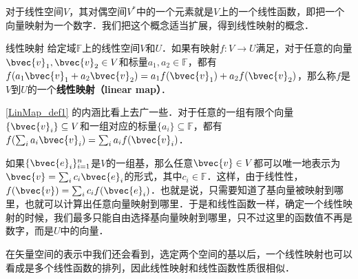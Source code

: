 



对于线性空间$V$，其对偶空间$V^*$中的一个元素就是$V$上的一个线性函数，即把一个向量映射为一个数字．我们把这个概念适当扩展，得到线性映射的概念．

\begin{definition}{线性映射}\label{LinMap_def1}
给定域$\mathbb{F}$上的线性空间$V$和$U$．如果有映射$f:V\rightarrow U$满足，对于任意的向量$\bvec{v}_1, \bvec{v}_2\in V$和标量$a_1, a_2\in\mathbb{F}$，都有$f(a_1\bvec{v}_1+a_2\bvec{v}_2)=a_1f(\bvec{v}_1)+a_2f(\bvec{v}_2)$，那么称$f$是$V$到$U$的一个\textbf{线性映射（linear map）}．
\end{definition}


\autoref{LinMap_def1} 的内涵比看上去广一些．对于任意的一组有限个向量$\{\bvec{v}_i\}\subseteq V$和一组对应的标量$\{a_i\}\subseteq\mathbb{F}$，都有$f(\sum_i a_i\bvec{v}_i)=\sum_i a_if(\bvec{v}_i)$．

如果$\{\bvec{e}_i\}_{i=1}^n$是$V$的一组基，那么任意$\bvec{v}\in V$都可以唯一地表示为$\bvec{v}=\sum_i c_i\bvec{e}_i$的形式，其中$c_i\in\mathbb{F}$．这样，由于线性性，$f(\bvec{v})=\sum_ic_if(\bvec{e}_i)$．也就是说，只需要知道了基向量被映射到哪里，也就可以计算出任意向量映射到哪里．于是和线性函数一样，确定一个线性映射的时候，我们最多只能自由选择基向量映射到哪里，只不过这里的函数值不再是数字，而是$U$中的向量．

在矢量空间的表示中我们还会看到，选定两个空间的基以后，一个线性映射也可以看成是多个线性函数的排列，因此线性映射和线性函数性质很相似．





